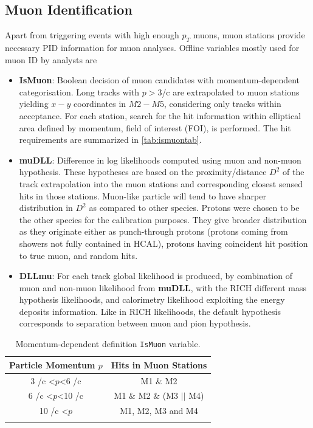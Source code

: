 \subsection{Muon Identification }
\label{muonID}
Apart from triggering events with high enough $p_{T}$ muons, muon stations provide necessary PID information for muon analyses. Offline variables mostly used for muon ID by analysts are
\begin{itemize}
	\item{\textbf{IsMuon}: Boolean decision of muon candidates with momentum-dependent categorisation. Long tracks with $p>3$\gev/c are extrapolated to muon stations yielding $x-y$ coordinates in $M2-M5$, considering only tracks within acceptance. For each station, search for the hit information within elliptical area defined by momentum, field of interest (\Gls{FOI}), is performed. The hit requirements are summarized in \autoref{tab:ismuontab}.}
	\item{\textbf{muDLL}: Difference in log likelihoods computed using muon and non-muon hypothesis. These hypotheses are based on the proximity/distance $D^{2}$ of the track extrapolation into the muon stations and corresponding closest sensed hits in those stations. Muon-like particle will tend to have sharper distribution in $D^{2}$ as compared to other species. Protons were chosen to be the other species for the calibration purposes. They give broader distribution as they originate either as punch-through protons (protons coming from showers not fully contained in \gls{HCAL}), protons having coincident hit position to true muon, and random hits.}
	\item{\textbf{DLLmu}}:  For each track global likelihood is produced, by combination of muon and non-muon likelihood from \textbf{muDLL}, with the \Gls{RICH} different mass hypothesis likelihoods, and calorimetry likelihood exploiting the energy deposits information. Like in \Gls{RICH} likelihoods, the default hypothesis corresponds to separation between muon and pion hypothesis.    

\end{itemize}


\begin{table}[!h]
	\centering
	\hspace*{-0.8cm}
	\begin{tabular}{c c}
		\hline
		Particle Momentum $p$  & Hits in Muon Stations \\ \hline
		3 \gev/c <$p$<6 \gev/c & M1 $\&$ M2\\
		6 \gev/c <$p$<10 \gev/c & M1 $\&$ M2 $\&$ (M3 $||$ M4) \\
		10 \gev/c <$p$ & M1, M2, M3 and M4 \\ \\\hline      
	\end{tabular}
	\caption{Momentum-dependent definition \texttt{IsMuon} variable.}
	\label{tab:ismuontab}
\end{table}   

